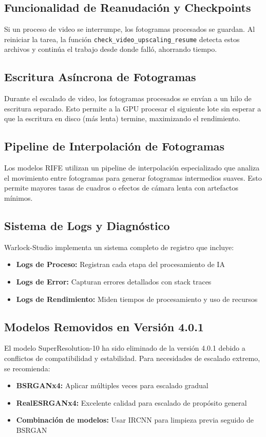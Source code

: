 \documentclass[11pt, a4paper]{article}
\newcommand{\inlinecode}[1]{\colorbox{WarlockLightGray}{\small\texttt{#1}}}
\begin{document}
\subsection{Funcionalidad de Reanudación y Checkpoints}
Si un proceso de video se interrumpe, los fotogramas procesados se guardan. Al reiniciar la tarea, la función \inlinecode{check\_video\_upscaling\_resume} detecta estos archivos y continúa el trabajo desde donde falló, ahorrando tiempo.

\subsection{Escritura Asíncrona de Fotogramas}
Durante el escalado de video, los fotogramas procesados se envían a un hilo de escritura separado. Esto permite a la GPU procesar el siguiente lote sin esperar a que la escritura en disco (más lenta) termine, maximizando el rendimiento.

\subsection{Pipeline de Interpolación de Fotogramas}
Los modelos RIFE utilizan un pipeline de interpolación especializado que analiza el movimiento entre fotogramas para generar fotogramas intermedios suaves. Esto permite mayores tasas de cuadros o efectos de cámara lenta con artefactos mínimos.

\subsection{Sistema de Logs y Diagnóstico}
Warlock-Studio implementa un sistema completo de registro que incluye:
\begin{itemize}[leftmargin=*]
    \item \textbf{Logs de Proceso:} Registran cada etapa del procesamiento de IA
    \item \textbf{Logs de Error:} Capturan errores detallados con stack traces
    \item \textbf{Logs de Rendimiento:} Miden tiempos de procesamiento y uso de recursos
\end{itemize}

\subsection{Modelos Removidos en Versión 4.0.1}
\begin{warnbox}
El modelo SuperResolution-10 ha sido eliminado de la versión 4.0.1 debido a conflictos de compatibilidad y estabilidad. Para necesidades de escalado extremo, se recomienda:
\begin{itemize}[leftmargin=*]
    \item \textbf{BSRGANx4:} Aplicar múltiples veces para escalado gradual
    \item \textbf{RealESRGANx4:} Excelente calidad para escalado de propósito general
    \item \textbf{Combinación de modelos:} Usar IRCNN para limpieza previa seguido de BSRGAN
\end{itemize}
\end{warnbox}
\end{document}
